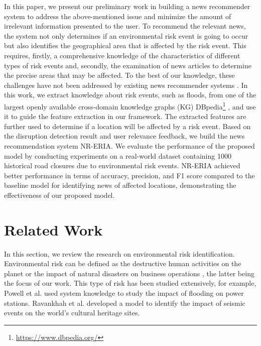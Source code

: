 \documentclass[
]{ceurart}
\begin{document}
In this paper, we present our preliminary work in building a news recommender system to address the above-mentioned issue and minimize the amount of irrelevant information presented to the user. 
To recommend the relevant news, the system not only determines if an environmental risk event is going to occur but also identifies the geographical area that is affected by the risk event.
This requires, firstly, a comprehensive knowledge of the characteristics of different types of risk events and, secondly, the examination of news articles to determine the precise areas that may be affected. To the best of our knowledge, these challenges have not been addressed by existing news recommender systems \cite{raza2022news}. In this work, we extract knowledge about risk events, such as floods, from one of the largest openly available cross-domain knowledge graphs (KG) DBpedia\footnote{\url{https://www.dbpedia.org/}} \cite{articledbpedia}, and use it to guide the feature extraction in our framework. The extracted features are further used to determine if a location will be affected by a risk event. 
Based on the disruption detection result and user relevance feedback, we build the news recommendation system NR-ERIA.
We evaluate the performance of the proposed model by conducting experiments on a real-world dataset containing 1000 historical road closures due to environmental risk events. NR-ERIA achieved better performance in terms of accuracy, precision, and F1 score compared to the baseline model for identifying news of affected locations, demonstrating the effectiveness of our proposed model. 


\section{Related Work}\label{sec:related_works}
In this section, we review the research on environmental risk identification. Environmental risk can be defined as the destructive human activities on the planet \cite{jones2001environmental} or the impact of natural disasters on business operations \cite{coburn2013taxonomy}, the latter being the focus of our work. This type of risk has been studied extensively, for example, Powell et al. \cite{powell2016system} used system knowledge to study the impact of flooding on power stations. Ravankhah et al. \cite{ravankhah2017multi} developed a model to identify the impact of seismic events on the world's cultural heritage sites.
\end{document}
